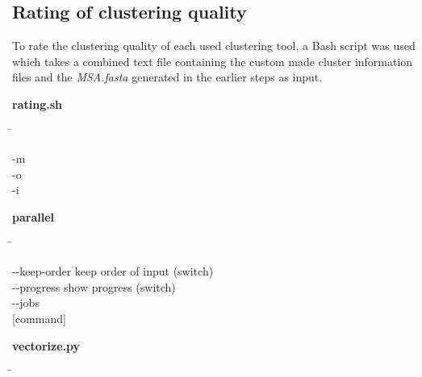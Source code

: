 \subsection{Rating of clustering quality} \label{subsec:2.2.4}

    To rate the clustering quality of each used clustering tool, a Bash script was used which takes a combined text file containing the custom made cluster information files and the \textit{MSA.fasta} generated in the earlier steps as input.

    \begin{leftbar}
        \textbf{rating.sh}
        \begin{nstabbing}
            \qquad \= \kill
            
            -m \\
            
            -o \\
            
            -i 
        \end{nstabbing}
    
        \begin{leftbar}
            \textbf{parallel}
            \begin{nstabbing}
                \qquad\qquad\qquad \= \kill
                
                -{}-{}keep-order \> keep order of input (switch)\\
                
                -{}-{}progress \> show progress (switch)\\
                
                -{}-{}jobs \\
                
                [command] \> [arguments]
            \end{nstabbing}
        \end{leftbar}
    
        \begin{leftbar}
            \textbf{vectorize.py}
            \begin{nstabbing}
                \qquad \= \kill
                
                \\
                
                \\
                

\end{nstabbing}
\end{leftbar}
\end{leftbar}
